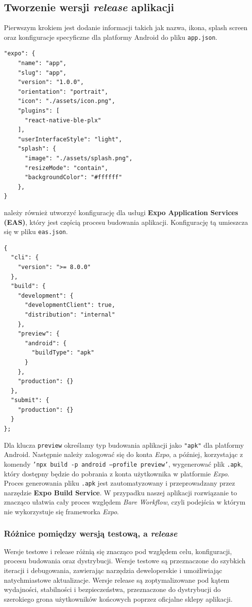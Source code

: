 \subsection{Tworzenie wersji \textit{release} aplikacji}
Pierwszym krokiem jest dodanie informacji takich jak nazwa, ikona, splash screen oraz konfiguracje specyficzne dla platformy Android do pliku \texttt{app.json}.

\begin{lstlisting}[caption=Plik app.json]
"expo": {
    "name": "app",
    "slug": "app",
    "version": "1.0.0",
    "orientation": "portrait",
    "icon": "./assets/icon.png",
    "plugins": [
      "react-native-ble-plx"
    ],
    "userInterfaceStyle": "light",
    "splash": {
      "image": "./assets/splash.png",
      "resizeMode": "contain",
      "backgroundColor": "#ffffff"
    },
}
\end{lstlisting}

należy również utworzyć konfigurację dla usługi \textbf{Expo Application Services (EAS)}, który jest częścią procesu budowania aplikacji. Konfigurację tą umieszcza się w pliku \texttt{eas.json}.

\begin{lstlisting}[caption=Plik eas.json]
{
  "cli": {
    "version": ">= 8.0.0"
  },
  "build": {
    "development": {
      "developmentClient": true,
      "distribution": "internal"
    },
    "preview": {
      "android": {
        "buildType": "apk"
      }
    },
    "production": {}
  },
  "submit": {
    "production": {}
  }
};
\end{lstlisting}

Dla klucza \texttt{preview} określamy typ budowania aplikacji jako \texttt{"apk"} dla platformy Android.
Następnie należy zalogować się do konta \textit{Expo}, a później, korzystając z komendy \texttt{'npx build -p android –profile preview'}, wygenerować plik \texttt{.apk}, który dostępny będzie do pobrania z konta użytkownika w platformie \textit{Expo}. Proces generowania pliku \texttt{.apk} jest zautomatyzowany i przeprowadzany przez narzędzie \textbf{Expo Build Service}. W przypadku naszej aplikacji rozwiązanie to znacząco ułatwia cały proces względem \textit{Bare Workflow}, czyli podejścia w którym nie wykorzystuje się frameworka \textit{Expo}.

\subsubsection{Różnice pomiędzy wersją testową, a \textit{release}}
Wersje testowe i release różnią się znacząco pod względem celu, konfiguracji, procesu budowania oraz dystrybucji. Wersje testowe są przeznaczone do szybkich iteracji i debugowania, zawierając narzędzia deweloperskie i umożliwiając natychmiastowe aktualizacje. Wersje release są zoptymalizowane pod kątem wydajności, stabilności i bezpieczeństwa, przeznaczone do dystrybucji do szerokiego grona użytkowników końcowych poprzez oficjalne sklepy aplikacji.

